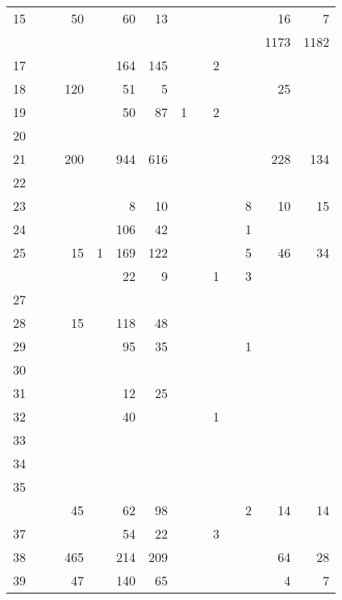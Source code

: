 \documentclass[
]{article}
\begin{document}
\begin{longtable}[l]{rrrrrrrrrrrrrr}
\rowcolor{lightgray}  15 &  &  & 50 &  & 60 & 13 &  &  &  &  &  & 16 & 7\\
\addlinespace
16 &  &  &  &  &  &  &  &  &  &  &  & 1173 & 1182\\
\rowcolor{lightgray}  17 &  &  &  &  & 164 & 145 &  &  & 2 &  &  &  & \\
18 &  &  & 120 &  & 51 & 5 &  &  &  &  &  & 25 & \\
\rowcolor{lightgray}  19 &  &  &  &  & 50 & 87 & 1 &  & 2 &  &  &  & \\
20 &  &  &  &  &  &  &  &  &  &  &  &  & \\
\addlinespace
\rowcolor{lightgray}  21 &  &  & 200 &  & 944 & 616 &  &  &  &  &  & 228 & 134\\
22 &  &  &  &  &  &  &  &  &  &  &  &  & \\
\rowcolor{lightgray}  23 &  &  &  &  & 8 & 10 &  &  &  &  & 8 & 10 & 15\\
24 &  &  &  &  & 106 & 42 &  &  &  &  & 1 &  & \\
\rowcolor{lightgray}  25 &  &  & 15 & 1 & 169 & 122 &  &  &  &  & 5 & 46 & 34\\
\addlinespace
26 &  &  &  &  & 22 & 9 &  &  & 1 &  & 3 &  & \\
\rowcolor{lightgray}  27 &  &  &  &  &  &  &  &  &  &  &  &  & \\
28 &  &  & 15 &  & 118 & 48 &  &  &  &  &  &  & \\
\rowcolor{lightgray}  29 &  &  &  &  & 95 & 35 &  &  &  &  & 1 &  & \\
30 &  &  &  &  &  &  &  &  &  &  &  &  & \\
\addlinespace
\rowcolor{lightgray}  31 &  &  &  &  & 12 & 25 &  &  &  &  &  &  & \\
32 &  &  &  &  & 40 &  &  &  & 1 &  &  &  & \\
\rowcolor{lightgray}  \rowcolor{yellow}  33 &  &  &  &  &  &  &  &  &  &  &  &  & \\
34 &  &  &  &  &  &  &  &  &  &  &  &  & \\
\rowcolor{lightgray}  35 &  &  &  &  &  &  &  &  &  &  &  &  & \\
\addlinespace
36 &  &  & 45 &  & 62 & 98 &  &  &  &  & 2 & 14 & 14\\
\rowcolor{lightgray}  37 &  &  &  &  & 54 & 22 &  &  & 3 &  &  &  & \\
38 &  &  & 465 &  & 214 & 209 &  &  &  &  &  & 64 & 28\\
\rowcolor{lightgray}  39 &  &  & 47 &  & 140 & 65 &  &  &  &  &  & 4 & 7\\

\end{longtable}
\end{document}

